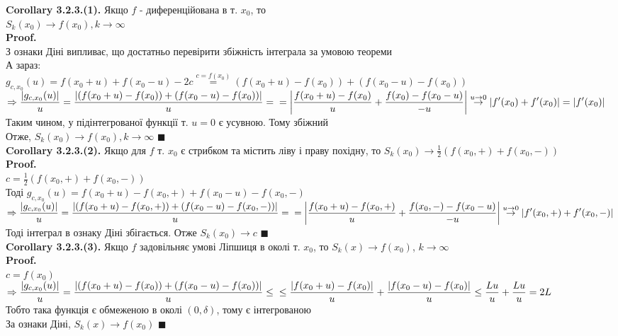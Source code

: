 \documentclass{math_library}
\begin{document}
\textbf{Corollary 3.2.3.(1).} Якщо $f$ - диференційована в т. $x_0$, то \\ $S_k(x_0) \to f(x_0), k \to \infty$\\
\textbf{Proof.}\\
З ознаки Діні випливає, що достатньо перевірити збіжність інтеграла за умовою теореми\\
А зараз:\\
$g_{c,x_0}(u) = f(x_0+u)+f(x_0-u) - 2c \overset{c = f(x_0)}{=} (f(x_0+u)-f(x_0))+(f(x_0-u)-f(x_0))$\\
$\displaystyle \Rightarrow \frac{\abs{g_{c,x_0}(u)}}{u} = \frac{\abs{(f(x_0+u)-f(x_0))+(f(x_0-u)-f(x_0))}}{u} = \\ = \abs{ \frac{f(x_0+u)-f(x_0)}{u} + \frac{f(x_0)-f(x_0-u)}{-u} } \overset{u \to 0}{\to} |f'(x_0)+f'(x_0)| = |f'(x_0)|$\\
Таким чином, у підінтегрованої функції т. $u=0$ є усувною. Тому збіжний\\
Отже, $S_k(x_0) \to f(x_0), k \to \infty$ $\blacksquare$
\bigskip \\
\textbf{Corollary 3.2.3.(2).} Якщо для $f$ т. $x_0$ є стрибком та містить ліву і праву похідну, то $\displaystyle S_k(x_0) \to \frac{1}{2} (f(x_0,+)+f(x_0,-))$\\
\textbf{Proof.}\\
$\displaystyle c = \frac{1}{2} (f(x_0,+)+f(x_0,-))$\\
Тоді $g_{c,x_0}(u) = f(x_0+u) - f(x_0,+) + f(x_0-u) - f(x_0,-)$\\
$\displaystyle \Rightarrow \frac{\abs{g_{c,x_0}(u)}}{u} = \frac{\abs{(f(x_0+u)-f(x_0,+))+(f(x_0-u)-f(x_0,-))}}{u} = \\ = \abs{ \frac{f(x_0+u)-f(x_0,+)}{u} + \frac{f(x_0,-)-f(x_0-u)}{-u} } \overset{u \to 0}{\to} |f'(x_0,+)+f'(x_0,-)|$\\
Тоді інтеграл в ознаку Діні збігається. Отже $S_k(x_0) \to c$ $\blacksquare$
\bigskip \\
\textbf{Corollary 3.2.3.(3).} Якщо $f$ задовільняє умові Ліпшиця в околі т. $x_0$, то $S_k(x) \to f(x_0)$, $k \to \infty$\\
\textbf{Proof.}\\
$c = f(x_0)$\\
$\displaystyle \Rightarrow \frac{\abs{g_{c,x_0}(u)}}{u} = \frac{\abs{(f(x_0+u)-f(x_0))+(f(x_0-u)-f(x_0))}}{u} \leq \\ \leq \frac{\abs{f(x_0+u)-f(x_0)}}{u} + \frac{\abs{f(x_0-u)-f(x_0)}}{u} \leq \frac{Lu}{u} + \frac{Lu}{u} = 2L$\\
Тобто така функція є обмеженою в околі $(0, \delta)$, тому є інтегрованою\\
За ознаки Діні, $S_k(x) \to f(x_0)$ $\blacksquare$
\bigskip \\
\end{document}
